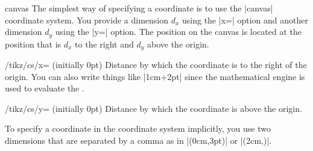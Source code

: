 \begin{coordinatesystem}{canvas}
  The simplest way of specifying a coordinate is to use the |canvas|
  coordinate system. You provide a dimension $d_x$ using the |x=|
  option and another dimension $d_y$ using the |y=| option. The position on
  the canvas is located at the position that is $d_x$ to the right and
  $d_y$ above the origin.

  \begin{key}{/tikz/cs/x= (initially 0pt)}
    Distance by which the coordinate
    is to the right of the origin. You can also write things like
    |1cm+2pt| since the mathematical engine is used to evaluate the
    .
  \end{key}

  \begin{key}{/tikz/cs/y= (initially 0pt)}
    Distance by which the coordinate
    is above the origin.
  \end{key}

\begin{codeexample}[]
\end{codeexample}

  To specify a coordinate in the coordinate system implicitly, you use
  two dimensions that are separated by a comma as in |(0cm,3pt)| or
  |(2cm,\textheight)|.
\begin{codeexample}[]
\end{codeexample}
\end{coordinatesystem}


